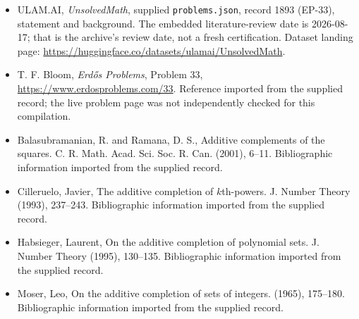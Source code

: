 \documentclass[11pt,a4paper]{article}
\begin{document}
{\small

\begin{itemize}

\item[\hypertarget{source:1893:1}{S1}] ULAM.AI, \emph{UnsolvedMath}, supplied \texttt{problems.json}, record 1893 (EP-33), statement and background. The embedded literature-review date is 2026-08-17; that is the archive’s review date, not a fresh certification. Dataset landing page: \url{https://huggingface.co/datasets/ulamai/UnsolvedMath}.

\item[\hypertarget{source:1893:2}{S2}] T. F. Bloom, \emph{Erdős Problems}, Problem 33, \url{https://www.erdosproblems.com/33}. Reference imported from the supplied record; the live problem page was not independently checked for this compilation.

\item[\hypertarget{source:1893:3}{S3}] Balasubramanian, R. and Ramana, D. S., Additive complements of the squares. C. R. Math. Acad. Sci. Soc. R. Can. (2001), 6--11. Bibliographic information imported from the supplied record.

\item[\hypertarget{source:1893:4}{S4}] Cilleruelo, Javier, The additive completion of {$k$}th-powers. J. Number Theory (1993), 237--243. Bibliographic information imported from the supplied record.

\item[\hypertarget{source:1893:5}{S5}] Habsieger, Laurent, On the additive completion of polynomial sets. J. Number Theory (1995), 130--135. Bibliographic information imported from the supplied record.

\item[\hypertarget{source:1893:6}{S6}] Moser, Leo, On the additive completion of sets of integers. (1965), 175--180. Bibliographic information imported from the supplied record.

\end{itemize}

}

\label{end:1893}
\end{document}
